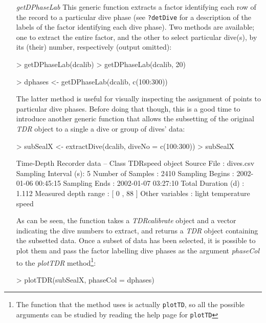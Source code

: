 \documentclass[12pt, letterpaper]{scrartcl}
\newcommand{\Rfunction}[1]{{\texttt{#1}}}
\newcommand{\Rclass}[1]{{\textit{#1}}}
\newcommand{\Rmethod}[1]{{\textit{#1}}}
\newcommand{\Rfunarg}[1]{{\textit{#1}}}
\begin{document}
\begin{itemize}
\item [\Rmethod{getDPhaseLab}] This generic function extracts a factor
  identifying each row of the record to a particular dive phase (see
  \verb|?detDive| for a description of the labels of the factor
  identifying each dive phase).  Two methods are available; one to extract
  the entire factor, and the other to select particular dive(s), by its
  (their) number, respectively (output omitted):
\begin{Schunk}
\begin{Sinput}
> getDPhaseLab(dcalib)
> getDPhaseLab(dcalib, 20)
\end{Sinput}
\end{Schunk}
\begin{Schunk}
\begin{Sinput}
> dphases <- getDPhaseLab(dcalib, c(100:300))
\end{Sinput}
\end{Schunk}
The latter method is useful for visually inspecting the assignment of
points to particular dive phases.  Before doing that though, this is a
good time to introduce another generic function that allows the subsetting
of the original \Rclass{TDR} object to a single a dive or group of dives'
data:
\begin{Schunk}
\begin{Sinput}
> subSealX <- extractDive(dcalib, diveNo = c(100:300))
> subSealX
\end{Sinput}
\begin{Soutput}
Time-Depth Recorder data -- Class TDRspeed object
  Source File          : dives.csv 
  Sampling Interval (s): 5 
  Number of Samples    : 2410 
  Sampling Begins      : 2002-01-06 00:45:15 
  Sampling Ends        : 2002-01-07 03:27:10 
  Total Duration (d)   : 1.112 
  Measured depth range : [ 0 , 88 ]
  Other variables      : light temperature speed 
\end{Soutput}
\end{Schunk}

As can be seen, the function takes a \Rclass{TDRcalibrate} object and a
vector indicating the dive numbers to extract, and returns a \Rclass{TDR}
object containing the subsetted data.  Once a subset of data has been
selected, it is possible to plot them and pass the factor labelling dive
phases as the argument \Rfunarg{phaseCol} to the \Rmethod{plotTDR}
method\footnote{The function that the method uses is actually
  \Rfunction{plotTD}, so all the possible arguments can be studied by
  reading the help page for \Rfunction{plotTD}}:

\begin{Schunk}
\begin{Sinput}
> plotTDR(subSealX, phaseCol = dphases)
\end{Sinput}
\end{Schunk}

\end{itemize}
\end{document}
